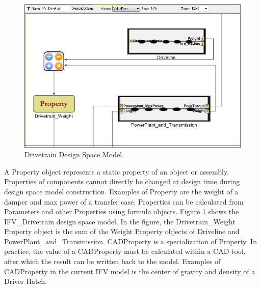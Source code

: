 \begin{figure}
\centering
\includegraphics[scale=0.40]{Figures/Property_VF.png}
\caption{Drivetrain Design Space Model.}
\label{fig:propertyVF}
\end{figure}
A Property object represents a static property of an object or assembly. Properties of components cannot directly be changed at design time during design space model construction. Examples of Property are the weight of a damper and max power of a transfer case. Properties can be calculated from Parameters and other Properties using formula objects. Figure \ref{fig:propertyVF} shows the IFV\_Drivetrain design space model. In the figure, the Drivetrain\_Weight Property object is the sum of the Weight Property objects of Driveline and PowerPlant\_and\_Transmission. CADProperty is a specialization of Property. In practice, the value of a CADProperty must be calculated within a CAD tool, after which the result can be written back to the model. Examples of CADProperty in the current IFV model is the center of gravity and density of a Driver Hatch.

